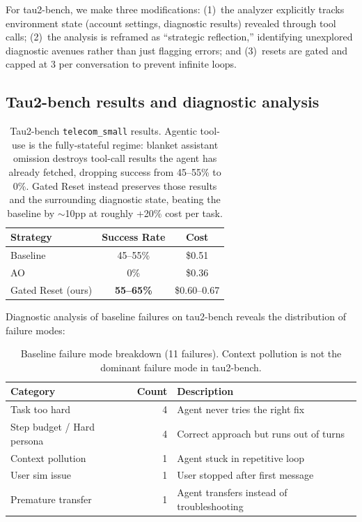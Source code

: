 \documentclass{article}
\begin{document}
For tau2-bench, we make three modifications: (1)~the analyzer explicitly tracks environment state (account settings, diagnostic results) revealed through tool calls; (2)~the analysis is reframed as ``strategic reflection,'' identifying unexplored diagnostic avenues rather than just flagging errors; and (3)~resets are gated and capped at 3 per conversation to prevent infinite loops.

\subsection{Tau2-bench results and diagnostic analysis}
\label{app:tau2-diagnostic}

\begin{table}[h]
\centering
\begin{tabular}{lcc}
\toprule
\textbf{Strategy} & \textbf{Success Rate} & \textbf{Cost} \\
\midrule
Baseline & 45--55\% & \$0.51 \\
AO & 0\% & \$0.36 \\
Gated Reset (ours) & \textbf{55--65\%} & \$0.60--0.67 \\
\bottomrule
\end{tabular}
\caption{Tau2-bench \texttt{telecom\_small} results. Agentic tool-use is the fully-stateful regime: blanket assistant omission destroys tool-call results the agent has already fetched, dropping success from 45--55\% to 0\%. Gated Reset instead preserves those results and the surrounding diagnostic state, beating the baseline by $\sim$10pp at roughly +20\% cost per task.}
\label{tab:tau2-main}
\end{table}

Diagnostic analysis of baseline failures on tau2-bench reveals the distribution of failure modes:

\begin{table}[h]
\centering
\begin{tabular}{lrl}
\toprule
\textbf{Category} & \textbf{Count} & \textbf{Description} \\
\midrule
Task too hard & 4 & Agent never tries the right fix \\
Step budget / Hard persona & 4 & Correct approach but runs out of turns \\
Context pollution & 1 & Agent stuck in repetitive loop \\
User sim issue & 1 & User stopped after first message \\
Premature transfer & 1 & Agent transfers instead of troubleshooting \\
\bottomrule
\end{tabular}
\caption{Baseline failure mode breakdown (11 failures). Context pollution is not the dominant failure mode in tau2-bench.}
\label{tab:tau2-failure-modes}
\end{table}
\end{document}
